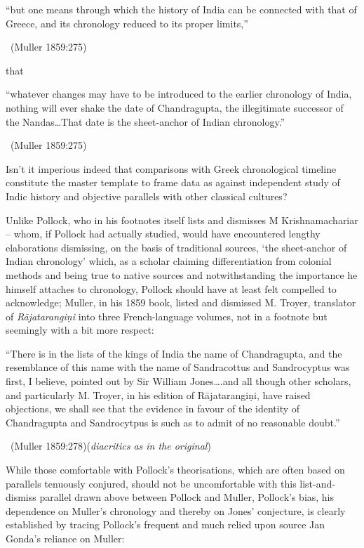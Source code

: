 \begin{myquote}
“but one means through which the history of India can be connected with that of Greece, and its chronology reduced to its proper limits,” 

~\hfill (Muller 1859:275)
\end{myquote}

that

\newpage

\begin{myquote}
“whatever changes may have to be introduced to the earlier chronology of India, nothing will ever shake the date of Chandragupta, the illegitimate successor of the Nandas…That date is the sheet-anchor of Indian chronology.” 

~\hfill (Muller 1859:275)
\end{myquote}

Isn’t it imperious indeed that comparisons with Greek chronological timeline constitute the master template to frame data as against independent study of Indic history and objective parallels with other classical cultures?

Unlike Pollock, who in his footnotes itself lists and dismisses M Krishnamachariar – whom, if Pollock had actually studied, would have encountered lengthy elaborations dismissing, on the basis of traditional sources, ‘the sheet-anchor of Indian chronology’ which, as a scholar claiming differentiation from colonial methods and being true to native sources and notwithstanding the importance he himself attaches to chronology, Pollock should have at least felt compelled to acknowledge; Muller, in his 1859 book, listed and dismissed M. Troyer, translator of \textit{Rājatarangiṇi} into three French-language volumes, not in a footnote but seemingly with a bit more respect:

\begin{myquote}
“There is in the lists of the kings of India the name of Chandragupta, and the resemblance of this name with the name of Sandracottus and Sandrocyptus was first, I believe, pointed out by Sir William Jones….and all though other scholars, and particularly M. Troyer, in his edition of Rājatarangiṇi, have raised objections, we shall see that the evidence in favour of the identity of Chandragupta and Sandrocytpus is such as to admit of no reasonable doubt.” 

~\hfill (Muller 1859:278)(\textit{diacritics as in the original})
\end{myquote}

While those comfortable with Pollock’s theorisations, which are often based on parallels tenuously conjured, should not be uncomfortable with this list-and-dismiss parallel drawn above between Pollock and Muller, Pollock’s bias, his dependence on Muller’s chronology and thereby on Jones’ conjecture, is clearly established by tracing Pollock’s frequent and much relied upon source Jan Gonda’s reliance on Muller:

